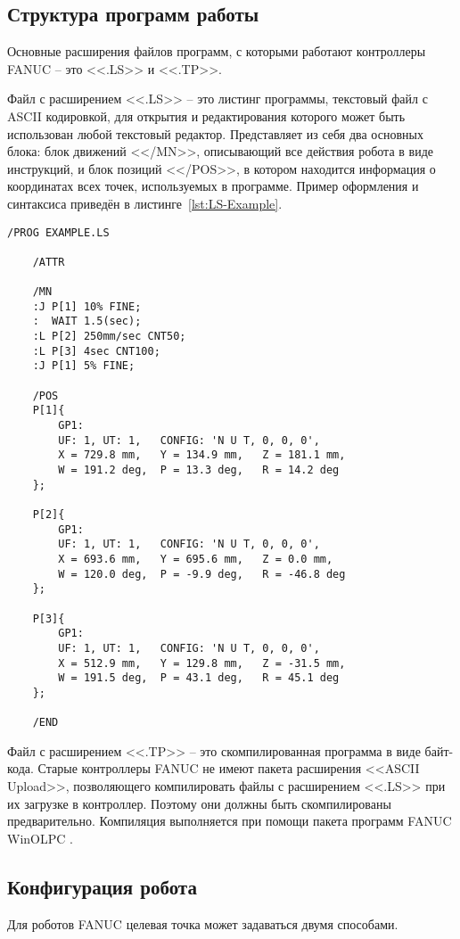 \subsection{Структура программ работы} \label{subsec:ProgramStructure}
Основные расширения файлов программ, с которыми работают контроллеры FANUC -- это <<.LS>> и <<.TP>>.

Файл с расширением <<.LS>> -- это листинг программы, текстовый файл с ASCII кодировкой, для открытия и редактирования которого может быть использован любой текстовый редактор.
Представляет из себя два основных блока: блок движений <</MN>>, описывающий все действия робота в виде инструкций, и блок позиций <</POS>>, в котором находится информация о координатах всех точек, используемых в программе.
Пример оформления и синтаксиса приведён в листинге~\ref{lst:LS-Example}.

\begin{lstlisting}[caption={Пример оформления .LS файлов}, label={lst:LS-Example}]
	/PROG EXAMPLE.LS

	/ATTR

	/MN
	:J P[1] 10% FINE;
	:  WAIT 1.5(sec);
	:L P[2] 250mm/sec CNT50;
	:L P[3] 4sec CNT100;
	:J P[1] 5% FINE;

	/POS
	P[1]{
		GP1:
		UF: 1, UT: 1,	CONFIG: 'N U T, 0, 0, 0',
		X = 729.8 mm,	Y = 134.9 mm,	Z = 181.1 mm,
		W = 191.2 deg,	P = 13.3 deg,	R = 14.2 deg
	};

	P[2]{
		GP1:
		UF: 1, UT: 1,	CONFIG: 'N U T, 0, 0, 0',
		X = 693.6 mm,	Y = 695.6 mm,	Z = 0.0 mm,
		W = 120.0 deg,	P = -9.9 deg,	R = -46.8 deg
	};

	P[3]{
		GP1:
		UF: 1, UT: 1,	CONFIG: 'N U T, 0, 0, 0',
		X = 512.9 mm,	Y = 129.8 mm,	Z = -31.5 mm,
		W = 191.5 deg,	P = 43.1 deg,	R = 45.1 deg
	};

	/END
\end{lstlisting}

Файл с расширением <<.TP>> -- это скомпилированная программа в виде байт-кода.
Старые контроллеры FANUC не имеют пакета расширения <<ASCII Upload>>, позволяющего компилировать файлы с расширением <<.LS>> при их загрузке в контроллер.
Поэтому они должны быть скомпилированы предварительно.
Компиляция выполняется при помощи пакета программ FANUC WinOLPC .

\subsection{Конфигурация робота} \label{subsec:RobotConfiguration}
Для роботов FANUC целевая точка может задаваться двумя способами.

